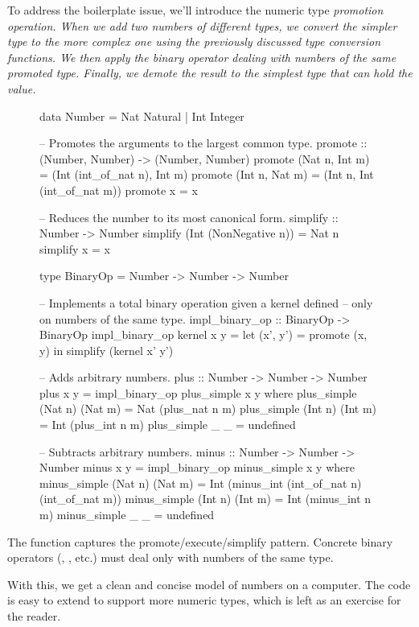 \documentclass{article}
\begin{document}
To address the boilerplate issue, we'll introduce the numeric type \em{promotion} operation.
When we add two numbers of different types, we convert the simpler type to the more complex one using the previously discussed type conversion functions.
We then apply the binary operator dealing with numbers of the same promoted type.
Finally, we demote the result to the simplest type that can hold the value.

\begin{figure}
\begin{code}[haskell]
data Number = Nat Natural | Int Integer

-- Promotes the arguments to the largest common type.
promote :: (Number, Number) -> (Number, Number)
promote (Nat n, Int m) = (Int (int_of_nat n), Int m) 
promote (Int n, Nat m) = (Int n, Int (int_of_nat m))
promote x = x

-- Reduces the number to its most canonical form.
simplify :: Number -> Number
simplify (Int (NonNegative n)) = Nat n
simplify x = x

type BinaryOp = Number -> Number -> Number

-- Implements a total binary operation given a kernel defined
-- only on numbers of the same type.
impl_binary_op :: BinaryOp -> BinaryOp
impl_binary_op kernel x y = let (x', y') = promote (x, y)
                            in simplify (kernel x' y')

-- Adds arbitrary numbers.
plus :: Number -> Number -> Number
plus x y = impl_binary_op plus_simple x y
  where plus_simple (Nat n) (Nat m) = Nat (plus_nat n m)
        plus_simple (Int n) (Int m) = Int (plus_int n m)
        plus_simple _ _ = undefined

-- Subtracts arbitrary numbers.
minus :: Number -> Number -> Number
minus x y = impl_binary_op minus_simple x y
  where minus_simple (Nat n) (Nat m) = Int (minus_int (int_of_nat n) (int_of_nat m))
        minus_simple (Int n) (Int m) = Int (minus_int n m)
        minus_simple _ _ = undefined
\end{code}
\end{figure}

The  function captures the promote/execute/simplify pattern.
Concrete binary operators (, , etc.) must deal only with numbers of the same type.

With this, we get a clean and concise model of numbers on a computer.
The code is easy to extend to support more numeric types, which is left as an exercise for the reader.
\end{document}
